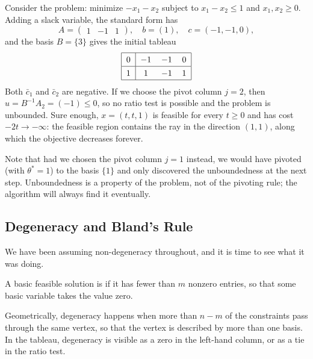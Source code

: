 \documentclass[a4paper]{scrartcl}
\begin{document}
\begin{example}
    Consider the problem: minimize $-x_1 - x_2$ subject to $x_1 - x_2 \leq 1$ and $x_1, x_2 \geq 0$. Adding a slack variable, the standard form has
    $$
    A = \begin{pmatrix}1 & -1 & 1\end{pmatrix}, \quad b = (1), \quad c = (-1,-1,0),
    $$
    and the basis $B = \{3\}$ gives the initial tableau
    $$
    \arraycolsep=6pt\def\arraystretch{1.3}
    \begin{array}{|c|ccc|}\hline
        0 & -1 & -1 & 0\\\hline
        1 & 1 & -1 & 1\\\hline
    \end{array}
    $$
    Both $\bar c_1$ and $\bar c_2$ are negative. If we choose the pivot column $j = 2$, then $u = B^{-1}A_2 = (-1) \leq 0$, so no ratio test is possible and the problem is unbounded. Sure enough, $x = (t, t, 1)$ is feasible for every $t \geq 0$ and has cost $-2t \rightarrow -\infty$: the feasible region contains the ray in the direction $(1,1)$, along which the objective decreases forever.

    Note that had we chosen the pivot column $j = 1$ instead, we would have pivoted (with $\theta^* = 1$) to the basis $\{1\}$ and only discovered the unboundedness at the next step. Unboundedness is a property of the problem, not of the pivoting rule; the algorithm will always find it eventually.
\end{example}

\subsection{Degeneracy and Bland's Rule}
\label{sec:degeneracy}

We have been assuming non-degeneracy throughout, and it is time to see what it was doing.

\begin{definition}[Degeneracy]
    A basic feasible solution is  if it has fewer than $m$ nonzero entries, so that some basic variable takes the value zero.
\end{definition}

Geometrically, degeneracy happens when more than $n - m$ of the constraints pass through the same vertex, so that the vertex is described by more than one basis. In the tableau, degeneracy is visible as a zero in the left-hand column, or as a tie in the ratio test.
\end{document}

